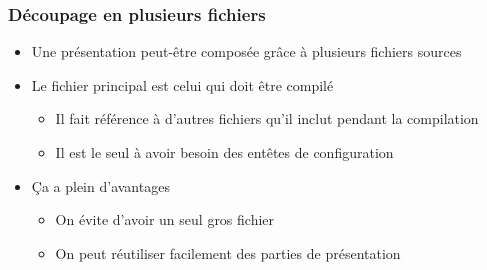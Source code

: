 \begin{frame}
  \frametitle{Découpage en plusieurs fichiers}

  \begin{itemize}
  \item Une présentation peut-être composée grâce à plusieurs fichiers sources
  \item Le fichier principal est celui qui doit être compilé

    \begin{itemize}
    \item Il fait référence à d'autres fichiers qu'il inclut pendant la compilation
    \item Il est le seul à avoir besoin des entêtes de configuration
    \end{itemize}

  \item Ça a plein d'avantages

    \begin{itemize}
    \item On évite d'avoir un seul gros fichier
    \item On peut réutiliser facilement des parties de présentation 
    \end{itemize}

  \end{itemize}
\end{frame}

